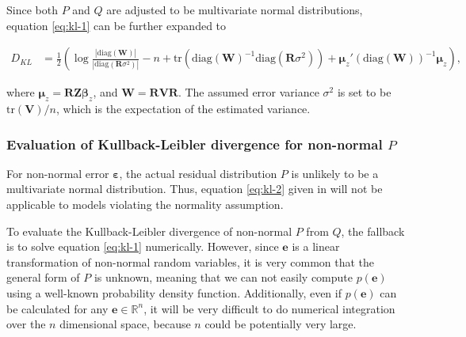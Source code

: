 \documentclass[]{interact}
\theoremstyle{plain}%
\theoremstyle{definition}
\theoremstyle{remark}
\begin{document}
Since both \(P\) and \(Q\) are adjusted to be multivariate normal
distributions, equation \ref{eq:kl-1} can be further expanded to

\begin{align}
\label{eq:kl-2}
D_{KL} &= \frac{1}{2}\left(\log\frac{|\text{diag}(\boldsymbol{W})|}{|\text{diag}(\boldsymbol{R}\sigma^2)|} - n + \text{tr}(\text{diag}(\boldsymbol{W})^{-1}\text{diag}(\boldsymbol{R}\sigma^2)) + \boldsymbol{\mu}_z'(\text{diag}(\boldsymbol{W}))^{-1}\boldsymbol{\mu}_z\right),
\end{align}

\noindent where
\(\boldsymbol{\mu}_z = \boldsymbol{R}\boldsymbol{Z}\boldsymbol{\beta}_z\),
and \(\boldsymbol{W} = \boldsymbol{R}\boldsymbol{V}\boldsymbol{R}\). The
assumed error variance \(\sigma^2\) is set to be
\(\text{tr}(\boldsymbol{V})/n\), which is the expectation of the
estimated variance.

\hypertarget{evaluation-of-kullback-leibler-divergence-for-non-normal-p}{%
\subsubsection{\texorpdfstring{Evaluation of Kullback-Leibler divergence
for non-normal
\(P\)}{Evaluation of Kullback-Leibler divergence for non-normal P}}\label{evaluation-of-kullback-leibler-divergence-for-non-normal-p}}

For non-normal error \(\boldsymbol{\varepsilon}\), the actual residual
distribution \(P\) is unlikely to be a multivariate normal distribution.
Thus, equation \ref{eq:kl-2} given in \citet{li2023plot} will not be
applicable to models violating the normality assumption.

To evaluate the Kullback-Leibler divergence of non-normal \(P\) from
\(Q\), the fallback is to solve equation \ref{eq:kl-1} numerically.
However, since \(\boldsymbol{e}\) is a linear transformation of
non-normal random variables, it is very common that the general form of
\(P\) is unknown, meaning that we can not easily compute
\(p(\boldsymbol{e})\) using a well-known probability density function.
Additionally, even if \(p(\boldsymbol{e})\) can be calculated for any
\(\boldsymbol{e} \in \mathbb{R}^n\), it will be very difficult to do
numerical integration over the \(n\) dimensional space, because \(n\)
could be potentially very large.
\end{document}
